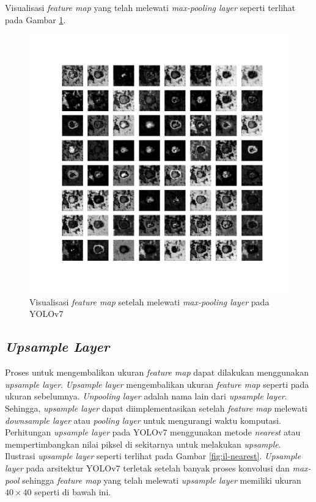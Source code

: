     Visualisasi \textit{feature map} yang telah melewati \textit{max-pooling layer} seperti terlihat pada Gambar \ref{fig:d-maxpool}.

    \begin{figure}[H]
        \begin{center}
            \includegraphics[width=12cm]{img/bab4/mp-layer.png}
            \caption{Visualisasi \textit{feature map} setelah melewati \textit{max-pooling layer} pada YOLOv7}
            \label{fig:d-maxpool}
        \end{center}
    \end{figure}

    \subsection{\textit{Upsample Layer}}

    Proses untuk mengembalikan ukuran \textit{feature map} dapat dilakukan menggunakan \textit{upsample layer}. \textit{Upsample layer} mengembalikan ukuran \textit{feature map} seperti pada ukuran sebelumnya. \textit{Unpooling layer} adalah nama lain dari \textit{upsample layer}. Sehingga, \textit{upsample layer} dapat diimplementasikan setelah \textit{feature map} melewati \textit{downsample layer} atau \textit{pooling layer} untuk mengurangi waktu komputasi. Perhitungan \textit{upsample layer} pada YOLOv7 menggunakan metode \textit{nearest} atau mempertimbangkan nilai piksel di sekitarnya untuk melakukan \textit{upsample}. Ilustrasi \textit{upsample layer} seperti terlihat pada Gambar \ref{fig:il-nearest}. \textit{Upsample layer} pada arsitektur YOLOv7 terletak setelah banyak proses konvolusi dan \textit{max-pool} sehingga \textit{feature map} yang telah melewati \textit{upsample layer} memiliki ukuran $40\times 40$ seperti di bawah ini.

